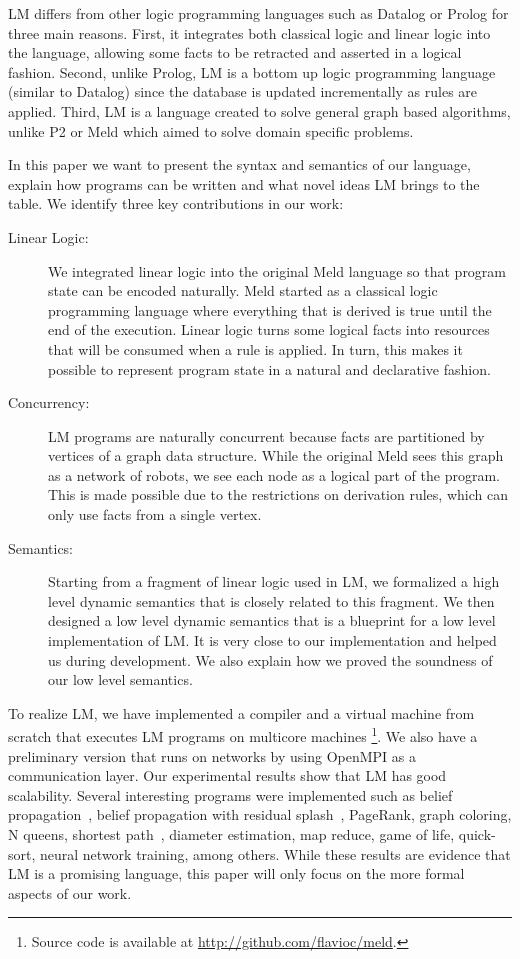 LM differs from other logic programming languages such as Datalog or Prolog for three main reasons. First, it integrates both classical
logic and linear logic into the language, allowing some facts to be retracted and asserted in a logical fashion. Second, unlike
Prolog, LM is a bottom up logic programming language (similar to Datalog) since the database is updated incrementally as rules are
applied. Third, LM is a language created to solve general graph based algorithms, unlike P2 or Meld which aimed to solve domain
specific problems.

In this paper we want to present the syntax and semantics of our language, explain how programs can be written
and what novel ideas LM brings to the table. We identify three key contributions in our work:

\begin{description}
   \item[Linear Logic:] We integrated linear logic into the original Meld language so that program state can be encoded naturally.
   Meld started as a classical logic programming language where everything that is derived is true until the end
   of the execution. Linear logic turns some logical facts into resources that will be consumed when a rule is applied. In turn, this makes it possible to represent program state in a natural and declarative fashion.
   \item[Concurrency:] LM programs are naturally concurrent because facts are partitioned by vertices of a graph data structure. While the original Meld sees this graph as a network of robots, we see each node as a logical part of the program. This is made possible due to the restrictions on derivation rules, which can only use facts from a single vertex.
   \item[Semantics:] Starting from a fragment of linear logic used in LM, we formalized a high level dynamic semantics that is closely related to this fragment.
   We then designed a low level dynamic semantics that is a blueprint for a low level implementation of LM. It is very
   close to our implementation and helped us during development. We also explain how we proved the soundness of our low level semantics.
\end{description}

To realize LM, we have implemented a compiler and a virtual machine from scratch that executes LM programs on multicore machines
\footnote{Source code is available at \url{http://github.com/flavioc/meld}.}. We also have a preliminary version that runs on networks by
using OpenMPI as a communication layer. Our experimental results show that LM has good scalability.
Several interesting programs were implemented such as belief propagation~\cite{Gonzalez+al:aistats09paraml},
belief propagation with residual splash~\cite{Gonzalez+al:aistats09paraml}, PageRank, graph coloring,
N queens, shortest path~\cite{Dijkstra}, diameter estimation, map reduce, game of life, quick-sort, neural network training, among others.
While these results are evidence that LM is a promising language, this paper will only focus on the more formal aspects of our work.
